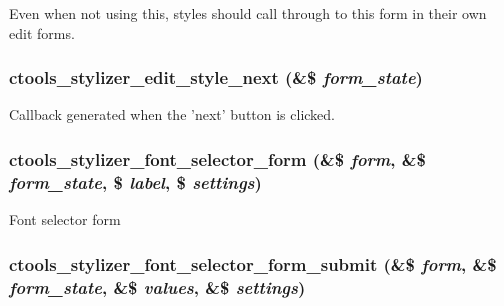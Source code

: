 Even when not using this, styles should call through to this form in their own edit forms. \hypertarget{includes_2stylizer_8inc_aa965f7128e036ac9223bf2e8b4e4b402}{
\subsubsection[{ctools\_\-stylizer\_\-edit\_\-style\_\-next}]{\setlength{\rightskip}{0pt plus 5cm}ctools\_\-stylizer\_\-edit\_\-style\_\-next (\&\$ {\em form\_\-state})}}
\label{includes_2stylizer_8inc_aa965f7128e036ac9223bf2e8b4e4b402}
Callback generated when the 'next' button is clicked. \hypertarget{includes_2stylizer_8inc_a7c2c003ec6849b26ab45b7b28af3f311}{
\subsubsection[{ctools\_\-stylizer\_\-font\_\-selector\_\-form}]{\setlength{\rightskip}{0pt plus 5cm}ctools\_\-stylizer\_\-font\_\-selector\_\-form (\&\$ {\em form}, \/  \&\$ {\em form\_\-state}, \/  \$ {\em label}, \/  \$ {\em settings})}}
\label{includes_2stylizer_8inc_a7c2c003ec6849b26ab45b7b28af3f311}
Font selector form \hypertarget{includes_2stylizer_8inc_a82a6b3afe1fbd52197afa3dceb692d78}{
\subsubsection[{ctools\_\-stylizer\_\-font\_\-selector\_\-form\_\-submit}]{\setlength{\rightskip}{0pt plus 5cm}ctools\_\-stylizer\_\-font\_\-selector\_\-form\_\-submit (\&\$ {\em form}, \/  \&\$ {\em form\_\-state}, \/  \&\$ {\em values}, \/  \&\$ {\em settings})}}
